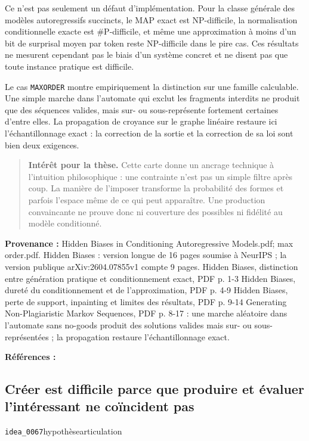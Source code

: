 \documentclass[10pt,a4paper]{article}
\begin{document}
Ce n'est pas seulement un défaut d'implémentation. Pour la classe générale des modèles autoregressifs succincts, le MAP exact est NP-difficile, la normalisation conditionnelle exacte est \#P-difficile, et même une approximation à moins d'un bit de surprisal moyen par token reste NP-difficile dans le pire cas. Ces résultats ne mesurent cependant pas le biais d'un système concret et ne disent pas que toute instance pratique est difficile.

Le cas \texttt{MAXORDER} montre empiriquement la distinction sur une famille calculable. Une simple marche dans l'automate qui exclut les fragments interdits ne produit que des séquences valides, mais sur- ou sous-représente fortement certaines d'entre elles. La propagation de croyance sur le graphe linéaire restaure ici l'échantillonnage exact : la correction de la sortie et la correction de sa loi sont bien deux exigences.

\begin{quote}
\textbf{Intérêt pour la thèse.} Cette carte donne un ancrage technique à l'intuition philosophique : une contrainte n'est pas un simple filtre après coup. La manière de l'imposer transforme la probabilité des formes et parfois l'espace même de ce qui peut apparaître. Une production convaincante ne prouve donc ni couverture des possibles ni fidélité au modèle conditionné.
\end{quote}
{\footnotesize\color{metadata}\textbf{Provenance :} Hidden Biases in Conditioning Autoregressive Models.pdf; max order.pdf. Hidden Biases : version longue de 16 pages soumise à NeurIPS ; la version publique arXiv:2604.07855v1 compte 9 pages. Hidden Biases, distinction entre génération pratique et conditionnement exact, PDF p. 1-3 Hidden Biases, dureté du conditionnement et de l'approximation, PDF p. 4-9 Hidden Biases, perte de support, inpainting et limites des résultats, PDF p. 9-14 Generating Non-Plagiaristic Markov Sequences, PDF p. 8-17 : une marche aléatoire dans l'automate sans no-goods produit des solutions valides mais sur- ou sous-représentées ; la propagation restaure l'échantillonnage exact.\par}
{\footnotesize\color{metadata}\textbf{Références :} \parencite{pachet2026biases,papadopoulos2016nonplagiaristic}\par}

\subsection{Créer est difficile parce que produire et évaluer l'intéressant ne coïncident pas}
{\small\color{metadata} \texttt{idea\_0067}\quad\textbullet\quad hypothèse\quad\textbullet\quad articulation\par}
\end{document}
